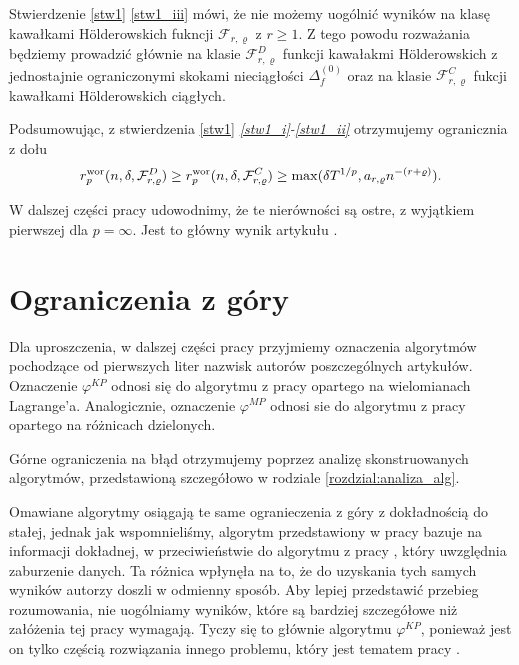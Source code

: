 \documentclass[oik, pdftex, robocza, man]{mgrwms}
\begin{document}
    Stwierdzenie \ref{stw1} \ref{stw1_iii} mówi, że nie możemy uogólnić wyników na klasę kawałkami Hölderowskich fukncji $\mathcal{F}_{r,\varrho}$ z $r \geq 1$. Z tego powodu rozważania będziemy prowadzić głównie na klasie $\mathcal{F}_{r,\varrho}^{D}$ funkcji kawałakmi Hölderowskich z jednostajnie ograniczonymi skokami nieciągłości $\Delta_{f}^{(0)}$ oraz na klasie $\mathcal{F}_{r,\varrho}^{C}$ fukcji kawałkami Hölderowskich ciągłych.

    Podsumowując, z stwierdzenia \ref{stw1} \textit{\ref{stw1_i}-\ref{stw1_ii}} otrzymujemy ogranicznia z dołu
    \begin{equation*}
        r^{\mathrm{wor}}_{p}(n, \delta, \mathcal{F}^{D}_{r,\varrho}) \geq r^{\mathrm{wor}}_{p}(n, \delta, \mathcal{F}^{C}_{r,\varrho}) \geq \max(\delta T^{1/p}, a_{r,\varrho} n^{-(r+\varrho)}).
    \end{equation*}

    W dalszej części pracy udowodnimy, że te nierówności są ostre, z wyjątkiem pierwszej dla $p=\infty$. Jest to główny wynik artykułu \cite{AoP}.


\section{Ograniczenia z góry}


    Dla uproszczenia, w dalszej części pracy przyjmiemy oznaczenia algorytmów pochodzące od pierwszych liter nazwisk autorów poszczególnych artykułów. Oznaczenie $\varphi^{KP}$ odnosi się do algorytmu z pracy \cite{CoDF} opartego na wielomianach Lagrange'a. Analogicznie, oznaczenie $\varphi^{MP}$ odnosi sie do algorytmu z pracy \cite{AoP} opartego na różnicach dzielonych.

    Górne ograniczenia na błąd otrzymujemy poprzez analizę skonstruowanych algorytmów, przedstawioną szczegółowo w rodziale \ref{rozdzial:analiza_alg}.
    
    Omawiane algorytmy osiągają te same ogranieczenia z góry z dokładnością do stałej, jednak jak wspomnieliśmy, algorytm przedstawiony w pracy \cite{CoDF} bazuje na informacji dokładnej, w przeciwieństwie do algorytmu z pracy \cite{AoP}, który uwzględnia zaburzenie danych. Ta różnica wpłynęła na to, że do uzyskania tych samych wyników autorzy doszli w odmienny sposób. Aby lepiej przedstawić przebieg rozumowania, nie uogólniamy wyników, które są bardziej szczegółowe niż załóżenia tej pracy wymagają. Tyczy się to głównie algorytmu $\varphi^{KP}$, ponieważ jest on tylko częścią rozwiązania innego problemu, który jest tematem pracy \cite{CoDF}.
\end{document}

